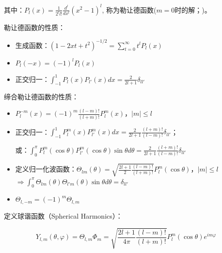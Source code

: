 其中：$P_l (x) = \frac{1}{{2^l l!}}\frac{{d^l }}{{dx^l }}\left( {x^2  - 1} \right)^l $, 称为勒让德函数($m = 0$时的解；)。

勒让德函数的性质：

\begin{itemize}
    \item 生成函数：$\left( {1 - 2xt + t^2 } \right)^{ - 1/2}  = \sum\limits_{t = 0}^\infty  {t^l P_l (x)} $

    \item $P_l ( - x) = ( - 1)^l P_l (x)$

    \item 正交归一：$\int_{ - 1}^1 {P_l (x)P_{l'} (x)dx}  = \frac{2}{{2l + 1}}\delta _{ll'} $

   \end{itemize}

缔合勒让德函数的性质：

\begin{itemize}
    \item $P_l^{ - m} (x) = \left( { - 1} \right)^m \frac{{\left( {l - m} \right)!}}{{\left( {l + m} \right)!}}P_l^m (x)$，$\left| m \right| \le l$

    \item 正交归一：$\int_{ - 1}^1 {P_l^m (x)P_{l'}^m (x)dx}  = \frac{2}{{2l + 1}}\frac{{(l + m)!}}{{(l - m)!}}\delta _{ll'} $；
    
 或：$\int_0^\pi  {P_l^m (\cos \theta )P_{l'}^m (\cos \theta )\sin \theta d\theta }  = \frac{2}{{2l + 1}}\frac{{(l + m)!}}{{(l - m)!}}\delta _{ll'} $


    \item 定义归一化波函数：$\Theta _{lm} \left( \theta  \right) = \sqrt {\frac{{2l + 1}}{2}\frac{{(l - m)!}}{{(l + m)!}}} P_l^m (\cos \theta )$，$\left| m \right| \le l$\\
$\Rightarrow \int_0^\pi  {\Theta _{lm} (\theta )\Theta _{l'm} (\theta )} \sin \theta d\theta  = \delta _{ll'} $

    \item $\Theta _{l, - m}  = ( - 1)^m \Theta _{l,m} $

   \end{itemize}

定义球谐函数（Spherical Harmonics）：


\begin{equation}\label{14-5}
Y_{l,m} (\theta ,\varphi ) = \Theta _{l,m} \Phi _m  = \sqrt {\frac{{2l + 1}}{{4\pi }}\frac{{(l - m)!}}{{(l + m)!}}} P_l^m (\cos \theta )e^{im\varphi }
\end{equation}


